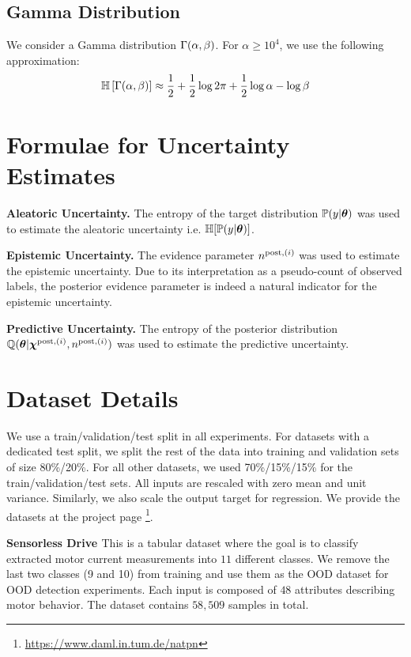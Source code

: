 \subsection{Gamma Distribution}

We consider a Gamma distribution $\operatorname{\Gamma}(\alpha, \beta)$. For $\alpha \ge 10^4$, we use the following approximation:
\begin{equation}
    \operatorname{\mathbb{H}}\left[\operatorname{\Gamma}(\alpha, \beta)\right] \approx \frac{1}{2} + \frac{1}{2} \log{2\pi} + \frac{1}{2} \log{\alpha} - \log{\beta}
\end{equation}


\section{Formulae for Uncertainty Estimates}

\textbf{Aleatoric Uncertainty.} The entropy of the target distribution $\mathbb{P}(y | \bm{\theta})$ was used to estimate the aleatoric uncertainty i.e. $\operatorname{\mathbb{H}}[\mathbb{P}(y | \bm{\theta})]$.

\textbf{Epistemic Uncertainty.} The evidence parameter $n^{\text{post}, (i)}$ was used to estimate the epistemic uncertainty. Due to its interpretation as a pseudo-count of observed labels, the posterior evidence parameter is indeed a natural indicator for the epistemic uncertainty.

\textbf{Predictive Uncertainty.} The entropy of the posterior distribution $\operatorname{\mathbb{Q}}(\bm{\theta}|\bm{\chi}^{\text{post}, (i)}, n^{\text{post}, (i)})$ was used to estimate the predictive uncertainty.

\section{Dataset Details}
\label{sec:dataset}

We use a train/validation/test split in all experiments. For datasets with a dedicated test split, we split the rest of the data into training and validation sets of size 80\%/20\%. For all other datasets, we used 70\%/15\%/15\% for the train/validation/test sets. All inputs are rescaled with zero mean and unit variance. Similarly, we also scale the output target for regression. We provide the datasets at the project page \footnote{\url{https://www.daml.in.tum.de/natpn}}.

\textbf{Sensorless Drive \citep{uci}} This is a tabular dataset where the goal is to classify extracted motor current measurements into $11$ different classes. We remove the last two classes (9 and 10) from training and use them as the OOD dataset for OOD detection experiments. Each input is composed of $48$ attributes describing motor behavior. The dataset contains $58,509$ samples in total.

